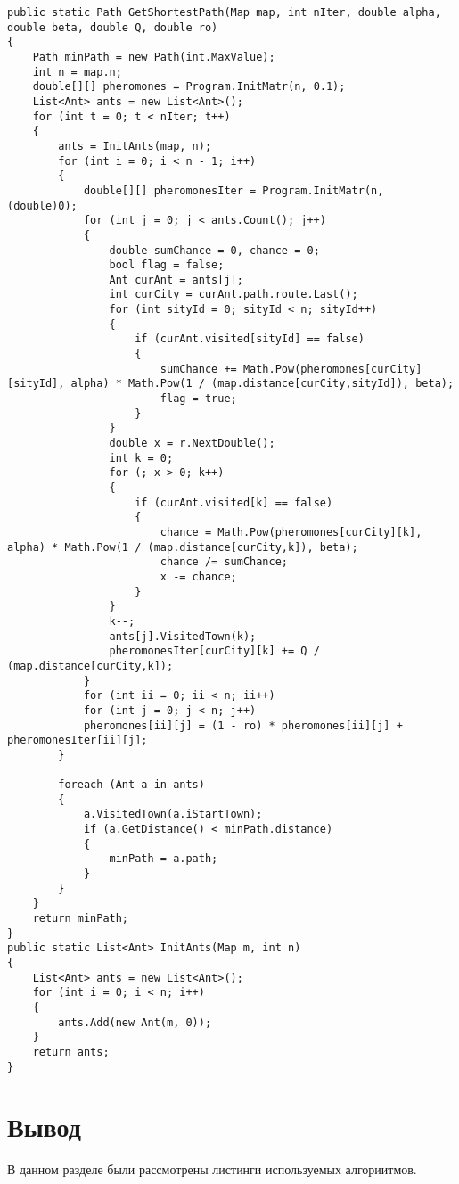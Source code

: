 \begin{center}
\begin{lstlisting}[label=l2, caption={Реализация муравьиного алгоритма}]
     public static Path GetShortestPath(Map map, int nIter, double alpha, double beta, double Q, double ro)
{
	Path minPath = new Path(int.MaxValue);
	int n = map.n;
	double[][] pheromones = Program.InitMatr(n, 0.1);
	List<Ant> ants = new List<Ant>();
	for (int t = 0; t < nIter; t++)
	{
		ants = InitAnts(map, n);
		for (int i = 0; i < n - 1; i++)
		{
			double[][] pheromonesIter = Program.InitMatr(n, (double)0); 
			for (int j = 0; j < ants.Count(); j++) 
			{
				double sumChance = 0, chance = 0;
				bool flag = false;
				Ant curAnt = ants[j];
				int curCity = curAnt.path.route.Last();
				for (int sityId = 0; sityId < n; sityId++) 
				{
					if (curAnt.visited[sityId] == false)
					{
						sumChance += Math.Pow(pheromones[curCity][sityId], alpha) * Math.Pow(1 / (map.distance[curCity,sityId]), beta); 
						flag = true;
					}
				}
				double x = r.NextDouble();
				int k = 0;
				for (; x > 0; k++)
				{
					if (curAnt.visited[k] == false)
					{
						chance = Math.Pow(pheromones[curCity][k], alpha) * Math.Pow(1 / (map.distance[curCity,k]), beta);
						chance /= sumChance;
						x -= chance;
					}
				}
				k--;
				ants[j].VisitedTown(k);
				pheromonesIter[curCity][k] += Q / (map.distance[curCity,k]);
			}
			for (int ii = 0; ii < n; ii++)
			for (int j = 0; j < n; j++)
			pheromones[ii][j] = (1 - ro) * pheromones[ii][j] + pheromonesIter[ii][j];
		}
		
		foreach (Ant a in ants)
		{
			a.VisitedTown(a.iStartTown);
			if (a.GetDistance() < minPath.distance)
			{
				minPath = a.path;
			}
		}                
	}
	return minPath;
}
public static List<Ant> InitAnts(Map m, int n)
{
	List<Ant> ants = new List<Ant>();
	for (int i = 0; i < n; i++)
	{
		ants.Add(new Ant(m, 0));
	}
	return ants;
}
\end{lstlisting}
\end{center}

\section*{\hsp Вывод}
В данном разделе были рассмотрены листинги используемых алгориитмов.
